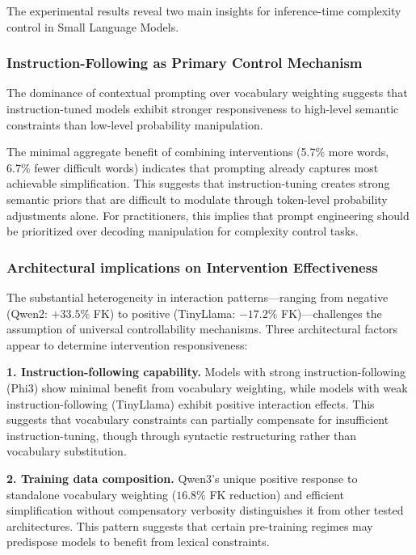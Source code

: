 \documentclass[10pt, a4paper]{article}
\begin{document}
The experimental results reveal two main insights for inference-time complexity control in Small Language Models.

\subsubsection{Instruction-Following as Primary Control Mechanism}

The dominance of contextual prompting over vocabulary weighting suggests that instruction-tuned models exhibit stronger responsiveness to high-level semantic constraints than low-level probability manipulation.

The minimal aggregate benefit of combining interventions (5.7\% more words, 6.7\% fewer difficult words) indicates that prompting already captures most achievable simplification. This suggests that instruction-tuning creates strong semantic priors that are difficult to modulate through token-level probability adjustments alone. For practitioners, this implies that prompt engineering should be prioritized over decoding manipulation for complexity control tasks.

\subsubsection{Architectural implications on Intervention Effectiveness}

The substantial heterogeneity in interaction patterns—ranging from negative (Qwen2: $+33.5\%$ FK) to positive (TinyLlama: $-17.2\%$ FK)—challenges the assumption of universal controllability mechanisms. Three architectural factors appear to determine intervention responsiveness:

\textbf{1. Instruction-following capability.} Models with strong instruction-following (Phi3) show minimal benefit from vocabulary weighting, while models with weak instruction-following (TinyLlama) exhibit positive interaction effects. This suggests that vocabulary constraints can partially compensate for insufficient instruction-tuning, though through syntactic restructuring rather than vocabulary substitution.

\textbf{2. Training data composition.} Qwen3's unique positive response to standalone vocabulary weighting ($16.8\%$ FK reduction) and efficient simplification without compensatory verbosity distinguishes it from other tested architectures. This pattern suggests that certain pre-training regimes may predispose models to benefit from lexical constraints.
\end{document}

